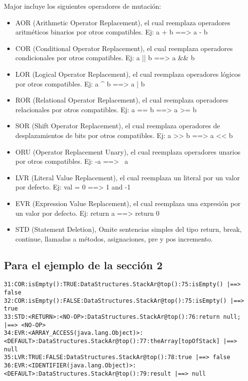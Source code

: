Major incluye los siguientes operadores de mutación: 

\begin{itemize}
  \item AOR (Arithmetic Operator Replacement), el cual reemplaza operadores aritméticos binarios por otros compatibles. Ej: a + b ==> a - b
  \item COR (Conditional Operator Replacement), el cual reemplaza operadores condicionales por otros compatibles. Ej: a || b ==> a && b
  \item LOR (Logical Operator Replacement), el cual reemplaza operadores lógicos por otros compatibles. Ej: a ^ b ==> a | b
  \item ROR (Relational Operator Replacement), el cual reemplaza operadores relacionales por otros compatibles. Ej: a == b ==> a >= b
  \item SOR (Shift Operator Replacement), el cual reemplaza operadores de desplazamientos de bits por otros compatibles. Ej: a >> b ==> a << b
  \item ORU (Operator Replacement Unary), el cual reemplaza operadores unarios por otros compatibles. Ej: -a ==> ~a
  \item LVR (Literal Value Replacement), el cual reemplaza un literal por un valor por defecto. Ej: val = 0 ==> 1 and -1
  \item EVR (Expression Value Replacement), el cual reemplaza una expresión por un valor por defecto. Ej: return a ==> return 0
  \item STD (Statement Deletion), Omite sentencias simples del tipo return, break, continue, llamadas a métodos, asignaciones, pre y pos incremento.
\end{itemize}


\subsection{Para el ejemplo de la sección 2}

\begin{lstlisting}[style=javastyle, caption=Mutaciones StackAr.top, label=lst:major]
31:COR:isEmpty():TRUE:DataStructures.StackAr@top():75:isEmpty() |==> false
32:COR:isEmpty():FALSE:DataStructures.StackAr@top():75:isEmpty() |==> true
33:STD:<RETURN>:<NO-OP>:DataStructures.StackAr@top():76:return null; |==> <NO-OP>
34:EVR:<ARRAY_ACCESS(java.lang.Object)>:<DEFAULT>:DataStructures.StackAr@top():77:theArray[topOfStack] |==> null
35:LVR:TRUE:FALSE:DataStructures.StackAr@top():78:true |==> false
36:EVR:<IDENTIFIER(java.lang.Object)>:<DEFAULT>:DataStructures.StackAr@top():79:result |==> null
\end{lstlisting}
